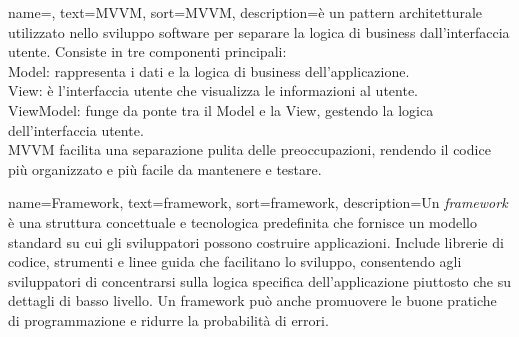  {
    name=,
    text=MVVM,
    sort=MVVM,
    description={è un pattern architetturale utilizzato nello sviluppo software per separare la logica di business dall'interfaccia utente. Consiste in tre componenti principali:\\
    Model: rappresenta i dati e la logica di business dell'applicazione.\\
    View: è l'interfaccia utente che visualizza le informazioni al utente.\\
    ViewModel: funge da ponte tra il Model e la View, gestendo la logica dell'interfaccia utente.\\
    MVVM facilita una separazione pulita delle preoccupazioni, rendendo il codice più organizzato e più facile da mantenere e testare.}
}


 {
    name=Framework,
    text=framework,
    sort=framework,
    description={Un \textit{framework} è una struttura concettuale e tecnologica predefinita che fornisce un modello standard su cui gli sviluppatori possono costruire applicazioni. Include librerie di codice, strumenti e linee guida che facilitano lo sviluppo, consentendo agli sviluppatori di concentrarsi sulla logica specifica dell'applicazione piuttosto che su dettagli di basso livello. Un framework può anche promuovere le buone pratiche di programmazione e ridurre la probabilità di errori.}
}





